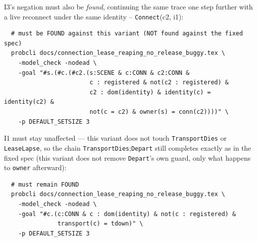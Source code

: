 \documentclass[a4paper,10pt,fleqn]{article}
\begin{document}
I3's negation must also be \emph{found}, continuing the same trace one
step further with a live reconnect under the same identity --
\texttt{Connect}(c2, i1):

\begin{verbatim}
  # must be FOUND against this variant (NOT found against the fixed spec)
  probcli docs/connection_lease_reaping_no_release_buggy.tex \
    -model_check -nodead \
    -goal "#s.(#c.(#c2.(s:SCENE & c:CONN & c2:CONN &
                        c : registered & not(c2 : registered) &
                        c2 : dom(identity) & identity(c) = identity(c2) &
                        not(c = c2) & owner(s) = conn(c2))))" \
    -p DEFAULT_SETSIZE 3
\end{verbatim}

I1 must stay unaffected --- this variant does not touch
\texttt{TransportDies} or \texttt{LeaseLapse}, so the chain
\texttt{TransportDies};\texttt{Depart} still completes exactly as in the
fixed spec (this variant does not remove \texttt{Depart}'s own guard, only
what happens to \texttt{owner} afterward):

\begin{verbatim}
  # must remain FOUND
  probcli docs/connection_lease_reaping_no_release_buggy.tex \
    -model_check -nodead \
    -goal "#c.(c:CONN & c : dom(identity) & not(c : registered) &
               transport(c) = tdown)" \
    -p DEFAULT_SETSIZE 3
\end{verbatim}
\end{document}
